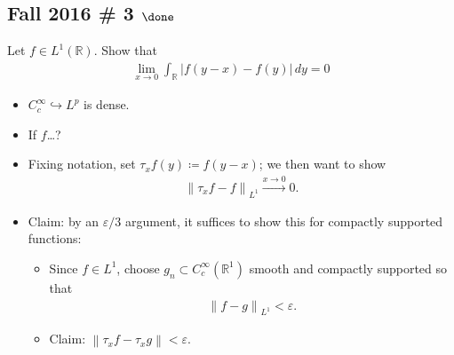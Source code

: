 \hypertarget{fall-2016-3-done}{%
\subsection{\texorpdfstring{Fall 2016 \# 3
\(\done\)}{Fall 2016 \# 3 \textbackslash done}}\label{fall-2016-3-done}}

Let \(f\in L^1({\mathbb{R}})\). Show that
\begin{align*}
\lim _{x \to 0} \int _{{\mathbb{R}}} {\left\lvert {f(y-x)-f(y)} \right\rvert} \, dy = 0
\end{align*}

\begin{solution}

\hfill

\begin{concept}

\hfill

\begin{itemize}
\tightlist
\item
  \(C_c^\infty \hookrightarrow L^p\) is dense.
\item
  If \(f\)\ldots?
\end{itemize}

\end{concept}

\begin{itemize}
\tightlist
\item
  Fixing notation, set \(\tau_x f(y) \coloneqq f(y-x)\); we then want to
  show
  \begin{align*}  
  {\left\lVert {\tau_x f -f} \right\rVert}_{L^1} \overset{x\to 0}\to 0
  .\end{align*}
\item
  Claim: by an \({\varepsilon}/3\) argument, it suffices to show this
  for compactly supported functions:

  \begin{itemize}
  \tightlist
  \item
    Since \(f\in L^1\), choose \(g_n\subset C_c^\infty({\mathbb{R}}^1)\)
    smooth and compactly supported so that
    \begin{align*}{\left\lVert {f-g} \right\rVert}_{L^1} < {\varepsilon}.\end{align*}
  \item
    Claim:
    \({\left\lVert {\tau_x f - \tau_x g} \right\rVert} < {\varepsilon}\).


\end{itemize}
\end{itemize}
\end{solution}
